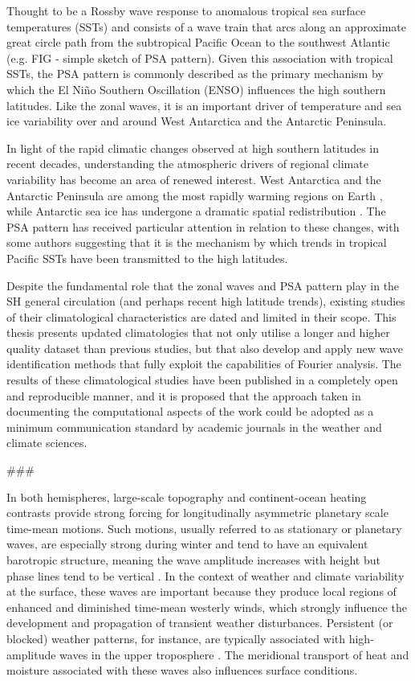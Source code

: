 Thought to be a Rossby wave response to anomalous tropical sea surface temperatures (SSTs) and consists of a wave train that arcs along an approximate great circle path from the subtropical Pacific Ocean to the southwest Atlantic (e.g. FIG - simple sketch of PSA pattern). Given this association with tropical SSTs, the PSA pattern is commonly described as the primary mechanism by which the El Ni\~{n}o Southern Oscillation (ENSO) influences the high southern latitudes. Like the zonal waves, it is an important driver of temperature and sea ice variability over and around West Antarctica and the Antarctic Peninsula. 

In light of the rapid climatic changes observed at high southern latitudes in recent decades, understanding the atmospheric drivers of regional climate variability has become an area of renewed interest. West Antarctica and the Antarctic Peninsula are among the most rapidly warming regions on Earth \citep[e.g.][]{Nicholas2014}, while Antarctic sea ice has undergone a dramatic spatial redistribution \citep{Simmonds2015}. The PSA pattern has received particular attention in relation to these changes, with some authors suggesting that it is the mechanism by which trends in tropical Pacific SSTs have been transmitted to the high latitudes.

Despite the fundamental role that the zonal waves and PSA pattern play in the SH general circulation (and perhaps recent high latitude trends), existing studies of their climatological characteristics are dated and limited in their scope. This thesis presents updated climatologies that not only utilise a longer and higher quality dataset than previous studies, but that also develop and apply new wave identification methods that fully exploit the capabilities of Fourier analysis. The results of these climatological studies have been published in a completely open and reproducible manner, and it is proposed that the approach taken in documenting the computational aspects of the work could be adopted as a minimum communication standard by academic journals in the weather and climate sciences.

###

In both hemispheres, large-scale topography and continent-ocean heating contrasts provide strong forcing for longitudinally asymmetric planetary scale time-mean motions. Such motions, usually referred to as stationary or planetary waves, are especially strong during winter and tend to have an equivalent barotropic structure, meaning the wave amplitude increases with height but phase lines tend to be vertical \citep{Holton2013}. In the context of weather and climate variability at the surface, these waves are important because they produce local regions of enhanced and diminished time-mean westerly winds, which strongly influence the development and propagation of transient weather disturbances. Persistent (or blocked) weather patterns, for instance, are typically associated with high-amplitude waves in the upper troposphere \citep[e.g.][]{Trenberth1985,Renwick2005}. The meridional transport of heat and moisture associated with these waves also influences surface conditions. 

